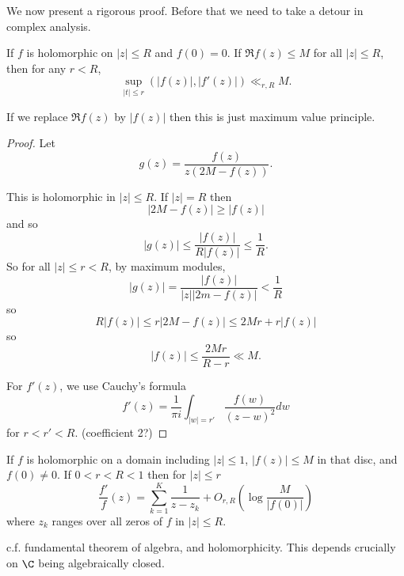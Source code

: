 \documentclass[a4paper]{article}
\theoremstyle{definition}
\begin{document}
We now present a rigorous proof. Before that we need to take a detour in complex analysis.

\begin{lemma}
  If \(f\) is holomorphic on \(|z| \leq R\) and \(f(0) = 0\). If \(\Re f(z) \leq M\) for all \(|z| \leq R\), then for any \(r < R\),
  \[
    \sup_{|t| \leq r} (|f(z)|, |f'(z)|) \ll_{r, R} M.
  \]
\end{lemma}
If we replace \(\Re f(z)\) by \(|f(z)|\) then this is just maximum value principle.

\begin{proof}
  Let
  \[
    g(z) = \frac{f(z)}{z (2M - f(z))}.
  \]

  This is holomorphic in \(|z| \leq R\). If \(|z| = R\) then
  \[
    |2M - f(z)| \geq |f(z)|
  \]
  and so
  \[
    |g(z)| \leq \frac{|f(z)|}{R |f(z)|} \leq \frac{1}{R}.
  \]
  So for all \(|z| \leq r < R\), by maximum modules,
  \[
    |g(z)| = \frac{|f(z)|}{|z| |2m - f(z)|} < \frac{1}{R}
  \]
  so
  \[
    R |f(z)| \leq r |2M - f(z)| \leq 2M r + r |f(z)|
  \]
  so
  \[
    |f(z)| \leq \frac{2M r}{R - r} \ll M.
  \]

  For \(f'(z)\), we use Cauchy's formula
  \[
    f'(z) = \frac{1}{\pi i} \int_{|w| = r'} \frac{f(w)}{(z - w)^2} dw
  \]
  for \(r < r' < R\). (coefficient 2?)
\end{proof}

\begin{lemma}
  If \(f\) is holomorphic on a domain including \(|z| \leq 1\), \(|f(z)| \leq M\) in that disc, and \(f(0) \neq 0\). If \(0 < r < R < 1\) then for \(|z| \leq r\)
  \[
    \frac{f'}{f} (z) = \sum_{k = 1}^K \frac{1}{z - z_k} + O_{r, R} (\log \frac{M}{|f(0)|})
  \]
  where \(z_k\) ranges over all zeros of \(f\) in \(|z| \leq R\).
\end{lemma}
c.f. fundamental theorem of algebra, and holomorphicity. This depends crucially on \(\C\) being algebraically closed.
\end{document}
